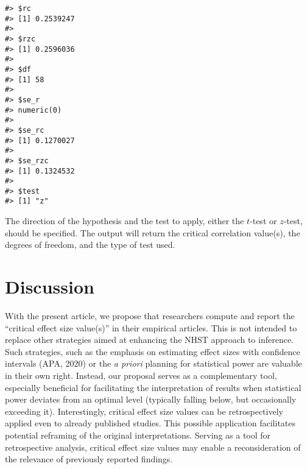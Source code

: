 \documentclass[
  man,floatsintext]{apa7}
\begin{document}
\begin{verbatim}
#> $rc
#> [1] 0.2539247
#> 
#> $rzc
#> [1] 0.2596036
#> 
#> $df
#> [1] 58
#> 
#> $se_r
#> numeric(0)
#> 
#> $se_rc
#> [1] 0.1270027
#> 
#> $se_rzc
#> [1] 0.1324532
#> 
#> $test
#> [1] "z"
\end{verbatim}

\normalsize

The direction of the hypothesis and the test to apply, either the \(t\)-test or \(z\)-test, should be specified. The output will return the critical correlation value(s), the degrees of freedom, and the type of test used.

\hypertarget{discussion}{%
\section{Discussion}\label{discussion}}

With the present article, we propose that researchers compute and report the ``critical effect size value(s)'' in their empirical articles. This is not intended to replace other strategies aimed at enhancing the NHST approach to inference. Such strategies, such as the emphasis on estimating effect sizes with confidence intervals (APA, 2020) or the \textit{a priori} planning for statistical power are valuable in their own right. Instead, our proposal serves as a complementary tool, especially beneficial for facilitating the interpretation of results when statistical power deviates from an optimal level (typically falling below, but occasionally exceeding it). Interestingly, critical effect size values can be retrospectively applied even to already published studies. This possible application facilitates potential reframing of the original interpretations. Serving as a tool for retrospective analysis, critical effect size values may enable a reconsideration of the relevance of previously reported findings.
\end{document}
